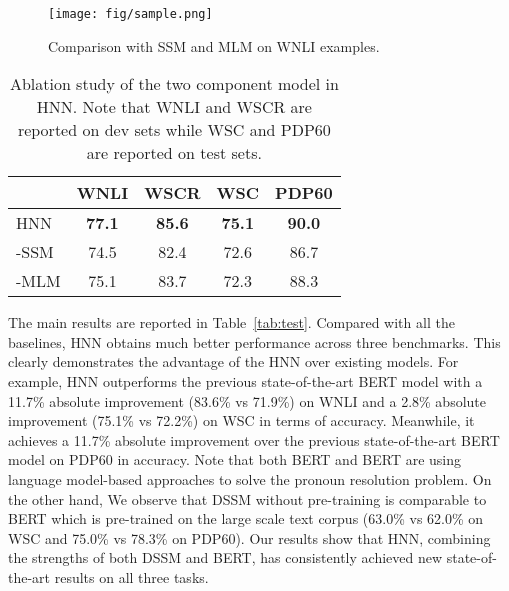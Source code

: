 \documentclass[11pt,a4paper]{article}
\newcommand{\nmodel}{HNN}
\newcommand{\wsc}{WSC}
\begin{document}
\begin{figure*}[ht!]
	\centering

    {
	\texttt{[image: fig/sample.png]}
    }
	\caption{Comparison with SSM and MLM on WNLI examples.}
	\label{fig:sample}
\end{figure*}



\begin{table}[htb!]
	\begin{center}
		\begin{tabular}{@{\hskip1pt}l |c c |c c } \hline
			 &WNLI &WSCR & {\wsc} & PDP60 \\ \hline \hline
            {\nmodel} &{\bf 77.1} & \textbf{85.6} &\bf 75.1 &  \bf 90.0\\\hline
            -SSM & 74.5 & 82.4& 72.6 &  86.7\\\hline
            -MLM &75.1 & 83.7& 72.3 & 88.3\\\hline
		\end{tabular}
	\end{center}
    \caption{Ablation study of the two component model in {\nmodel}. Note that WNLI and WSCR are reported on dev sets while WSC and PDP60 are reported on test sets.}
	\label{tab:mlm_ssm}
\end{table}












The main results are reported in Table~\ref{tab:test}. Compared with all the baselines, {\nmodel} obtains much better performance across three benchmarks. 
This clearly demonstrates the advantage of the {\nmodel} over existing models. 
For example, {\nmodel} outperforms the previous state-of-the-art BERT model with a 11.7\% absolute improvement (83.6\% vs 71.9\%) on WNLI and a 2.8\% absolute improvement (75.1\% vs 72.2\%) on {\wsc} in terms of accuracy.
Meanwhile, it achieves a 11.7\% absolute improvement over the previous state-of-the-art BERT model on PDP60 in accuracy. 
Note that both BERT and BERT are using language model-based approaches to solve the pronoun resolution problem. 
On the other hand, We observe that DSSM without pre-training is comparable to BERT which is pre-trained on the large scale text corpus (63.0\% vs 62.0\% on WSC and 75.0\% vs 78.3\% on PDP60). Our results show that {\nmodel}, combining the strengths of both DSSM and BERT, has consistently achieved new state-of-the-art results on all three tasks.
\end{document}
